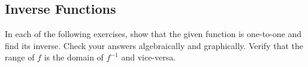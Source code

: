 \documentclass[12pt]{book}
\theoremstyle{definition}
\begin{document}
\subsection*{Inverse Functions}
In each of the following exercises, show that the given function is one-to-one and find its inverse.  Check your answers algebraically and graphically.  Verify that the range of $f$ is the domain of $f^{-1}$ and vice-versa.
\end{document}
